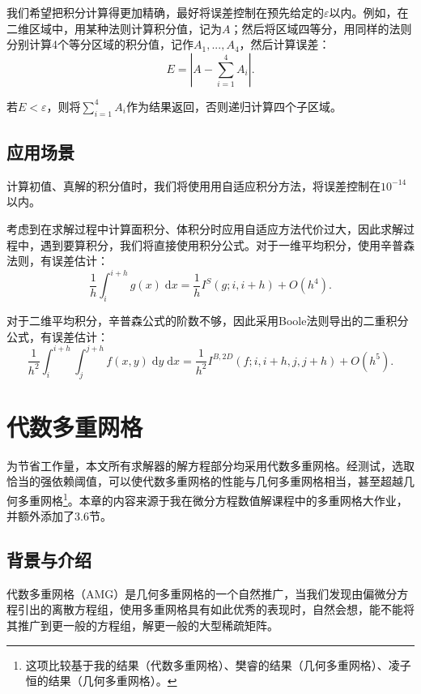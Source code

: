 \documentclass[lang=cn,10pt,bibend=bibtex]{elegantbook}
\begin{document}
我们希望把积分计算得更加精确，最好将误差控制在预先给定的$\varepsilon$以内。例如，在二维区域中，用某种法则计算积分值，记为$A$；然后将区域四等分，用同样的法则分别计算4个等分区域的积分值，记作$A_1,...,A_4$，然后计算误差：
\begin{equation*}
  E=|A-\sum_{i=1}^4 A_i|.
\end{equation*}

若$E<\varepsilon$，则将$\sum_{i=1}^4 A_i$作为结果返回，否则递归计算四个子区域。

\section{应用场景}

计算初值、真解的积分值时，我们将使用用自适应积分方法，将误差控制在$10^{-14}$以内。

考虑到在求解过程中计算面积分、体积分时应用自适应方法代价过大，因此求解过程中，遇到要算积分，我们将直接使用积分公式。对于一维平均积分，使用辛普森法则，有误差估计：
\begin{equation*}
  \frac{1}{h}\int_i^{i+h} g(x) \;\text{d}x=\frac{1}{h}I^S(g;i,i+h)+O(h^4).
\end{equation*}

对于二维平均积分，辛普森公式的阶数不够，因此采用Boole法则导出的二重积分公式，有误差估计：
\begin{equation*}
  \frac{1}{h^2}\int_i^{i+h}\int_j^{j+h} f(x,y) \;\text{d}y\;\text{d}x=\frac{1}{h^2}I^{B,2D}(f;i,i+h,j,j+h)+O(h^5).
\end{equation*}

\vspace{6em}

\chapter{代数多重网格}

为节省工作量，本文所有求解器的解方程部分均采用代数多重网格。经测试，选取恰当的强依赖阈值，可以使代数多重网格的性能与几何多重网格相当，甚至超越几何多重网格\footnote{这项比较基于我的结果（代数多重网格）、樊睿的结果（几何多重网格）、凌子恒的结果（几何多重网格）。}。本章的内容来源于我在微分方程数值解课程中的多重网格大作业，并额外添加了3.6节。

\section{背景与介绍}

代数多重网格（AMG）是几何多重网格的一个自然推广，当我们发现由偏微分方程引出的离散方程组，使用多重网格具有如此优秀的表现时，自然会想，能不能将其推广到更一般的方程组，解更一般的大型稀疏矩阵。
\end{document}
